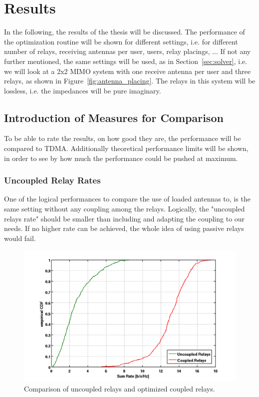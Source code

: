 \chapter{Results}
\label{sec:results}

In the following, the results of the thesis will be discussed.
The performance of the optimization routine will be shown for different settings, i.e. for different number of relays, receiving antennas per user, users, relay placings, ...
If not any further mentioned, the same settings will be used, as in Section~\ref{sec:solver}, i.e.
we will look at a 2x2 MIMO system with one receive antenna per user and three relays, as shown in Figure~\ref{fig:antenna_placing}.
The relays in this system will be lossless, i.e. the impedances will be pure imaginary.

\section{Introduction of Measures for Comparison}
\label{sec:measures}
To be able to rate the results, on how good they are, the performance will be compared to TDMA.
Additionally theoretical performance limits will be shown, in order to see by how much the performance could be pushed at maximum.

\subsection{Uncoupled Relay Rates}
One of the logical performances to compare the use of loaded antennas to, is the same setting without any coupling among the relays.
Logically, the "uncoupled relays rate" should be smaller than including and adapting the coupling to our needs.
If no higher rate can be achieved, the whole idea of using passive relays would fail.
\begin{figure}[h]
\centering
  \includegraphics[width=0.7\linewidth]{images/Coupledcomparison.png}
\caption{Comparison of uncoupled relays and optimized coupled relays.}
\label{fig:coupledcomparison}
\end{figure}


